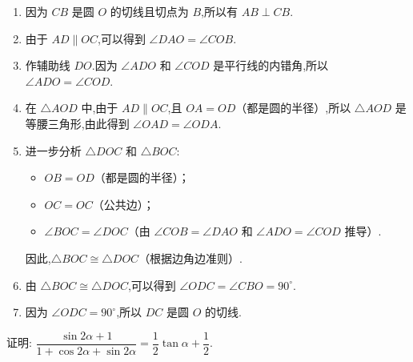 \begin{questions}
\begin{proofsolution}
\begin{center}
		\end{center}
		\begin{enumerate}[label=\protect\circled{\arabic*}]
			\item 因为 $CB$ 是圆 $O$ 的切线且切点为 $B$,所以有 $AB \perp CB$.
			\item 由于 $AD \parallel OC$,可以得到 $\angle DAO = \angle COB$.
			\item 作辅助线 $DO$.因为 $\angle ADO$ 和 $\angle COD$ 是平行线的内错角,所以 $\angle ADO = \angle COD$.
			\item 在 $\triangle AOD$ 中,由于 $AD \parallel OC$,且 $OA = OD$（都是圆的半径）,所以 $\triangle AOD$ 是等腰三角形,由此得到 $\angle OAD = \angle ODA$.
			\item 进一步分析 $\triangle DOC$ 和 $\triangle BOC$:
			      \begin{itemize}
				      \item $OB = OD$（都是圆的半径）；
				      \item $OC = OC$（公共边）；
				      \item $\angle BOC = \angle DOC$（由 $\angle COB = \angle DAO$ 和 $\angle ADO = \angle COD$ 推导）.
			      \end{itemize}
			      因此,$\triangle BOC \cong \triangle DOC$（根据边角边准则）.
			\item 由 $\triangle BOC \cong \triangle DOC$,可以得到 $\angle ODC = \angle CBO = 90^\circ$.
			\item 因为 $\angle ODC = 90^\circ$,所以 $DC$ 是圆 $O$ 的切线.
		\end{enumerate}
	\end{proofsolution}
	\pagebreak
	\question[10] 证明: $\dfrac{\sin2\alpha + 1}{1+\cos2\alpha + \sin2\alpha} = \dfrac12\tan\alpha + \dfrac12$.
	\begin{proofsolution}
\end{proofsolution}
\end{questions}
